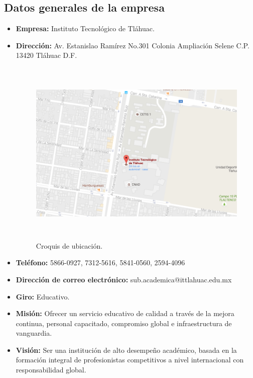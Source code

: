 \subsection{Datos generales de la empresa}
\begin{itemize}
    \item \textbf{Empresa:} Instituto Tecnol\'ogico de Tl\'ahuac.
    \item \textbf{Direcci\'on:} Av. Estanislao Ram\'irez No.301 Colonia Ampliaci\'on Selene C.P. 13420 Tl\'ahuac D.F.
    \begin{figure}[htb]
        \centering
        \includegraphics[width=14cm, height=9cm]{figuras/croquis}
        \caption{Croquis de ubicaci\'on.}
        \label{fig_croquis}
    \end{figure}
    \item \textbf{Tel\'efono:} 5866-0927, 7312-5616, 5841-0560, 2594-4096
    \item \textbf{Direcci\'on de correo electr\'onico:} sub.academica@ittlahuac.edu.mx
    \item \textbf{Giro:} Educativo.
    \item \textbf{Misi\'on:} Ofrecer un servicio educativo de calidad a trav\'es de la mejora continua, personal capacitado, compromiso global e infraestructura de vanguardia.

    \item \textbf{Visi\'on:} Ser una instituci\'on de alto desempe\~no acad\'emico, basada en la formaci\'on integral de profesionistas competitivos a nivel internacional con responsabilidad global.


\end{itemize}
